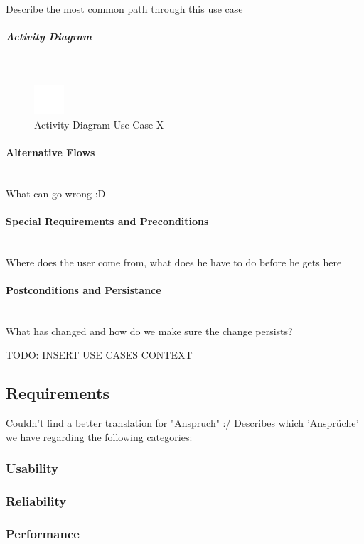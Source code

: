 Describe the most common path through this use case

\subparagraph{Activity Diagram}\mbox{}\\
\begin{figure}[h]
	\centering
	\includegraphics[width=0.1\textwidth]{Content/Domain/placeholder.png}
	\caption{Activity Diagram Use Case X}
	\label{fig:label12}
\end{figure}

\paragraph*{Alternative Flows}\mbox{}\\
What can go wrong :D

\paragraph*{Special Requirements and Preconditions}\mbox{}\\
Where does the user come from, what does he have to do before he gets here

\paragraph*{Postconditions and Persistance}\mbox{}\\
What has changed and how do we make sure the change persists?

TODO: INSERT USE CASES CONTEXT

\subsection{Requirements}
\label{sec:domainBc}
Couldn't find a better translation for "Anspruch" :/
Describes which 'Ansprüche' we have regarding the following categories:
\subsubsection{Usability}
\label{sec:domainBca}
\subsubsection{Reliability}
\label{sec:domainBcb}
\subsubsection{Performance}
\label{sec:domainBcc}
